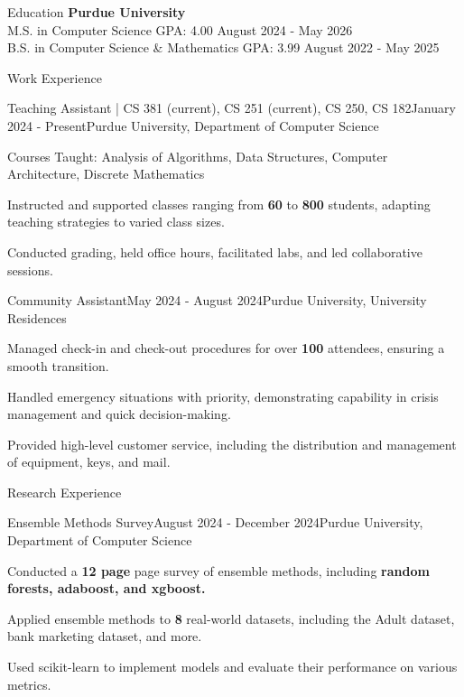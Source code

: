 \documentclass[
    11pt, %
]{resume} %
\begin{document}
\small

\begin{rSection}{Education}
    \textbf{Purdue University} \\
    M.S. in Computer Science \hfill GPA: 4.00 \quad August 2024 - May 2026 \\
    B.S. in Computer Science \& Mathematics \hfill GPA: 3.99 \quad August 2022 - May 2025
\end{rSection}
\begin{rSection}{Work Experience}
    \begin{rSubsection}{Teaching Assistant | CS 381 (current), CS 251 (current), CS 250, CS 182}{January 2024 - Present}{Purdue University, Department of Computer Science}{}
      \item Courses Taught: Analysis of Algorithms, Data Structures, Computer Architecture, Discrete Mathematics
      \item Instructed and supported classes ranging from \textbf{60} to \textbf{800} students, adapting teaching strategies to varied class sizes.
      \item Conducted grading, held office hours, facilitated labs, and led collaborative sessions.
    \end{rSubsection}
    
\begin{rSubsection}{Community Assistant}{May 2024 - August 2024}{Purdue University, University Residences}{}
    \item Managed check-in and check-out procedures for over \textbf{100} attendees, ensuring a smooth transition.
    \item Handled emergency situations with priority, demonstrating capability in crisis management and quick decision-making.
    \item Provided high-level customer service, including the distribution and management of equipment, keys, and mail.
\end{rSubsection}
\end{rSection}

\begin{rSection}{Research Experience}
  \begin{rSubsection}{Ensemble Methods Survey}{August 2024 - December 2024}{Purdue University, Department of Computer Science}{}
  \item Conducted a \textbf{12 page} page survey of ensemble methods, including \textbf{random forests, adaboost, and xgboost.}
  \item Applied ensemble methods to \textbf{8} real-world datasets, including the Adult dataset, bank marketing dataset, and more.
  \item Used scikit-learn to implement models and evaluate their performance on various metrics.
  \end{rSubsection}
\end{rSection}
\end{document}
